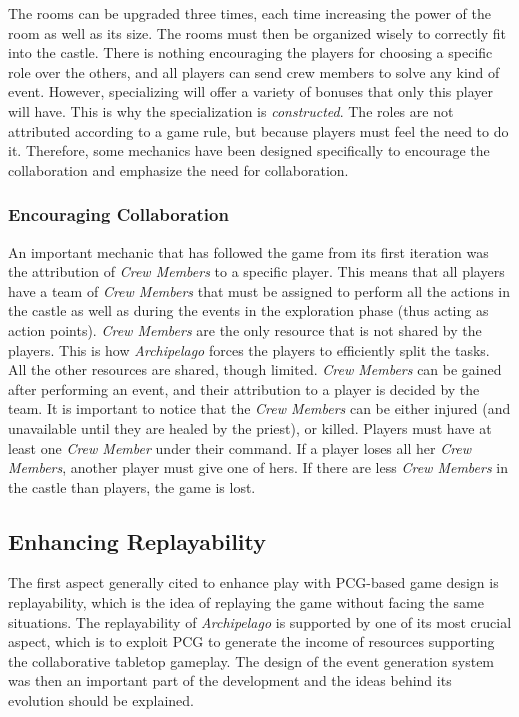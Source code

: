 The rooms can be upgraded three times, each time increasing the power of the room as well as its size. The rooms must then be organized wisely to correctly fit into the castle. 
There is nothing encouraging the players for choosing a specific role over the others, and all players can send crew members to solve any kind of event. However, specializing will offer a variety of bonuses that only this player will have. This is why the specialization is \textit{constructed}. The roles are not attributed according to a game rule, but because players must feel the need to do it. Therefore, some mechanics have been designed specifically to encourage the collaboration and emphasize the need for collaboration.
\subsubsection{Encouraging Collaboration} 
An important mechanic that has followed the game from its first iteration was the attribution of \textit{Crew Members} to a specific player. This means that all players have a team of \textit{Crew Members} that must be assigned to perform all the actions in the castle as well as during the events in the exploration phase (thus acting as action points). \textit{Crew Members} are the only resource that is not shared by the players. This is how \textit{Archipelago} forces the players to efficiently split the tasks. All the other resources are shared, though limited. \textit{Crew Members} can be gained after performing an event, and their attribution to a player is decided by the team. It is important to notice that the \textit{Crew Members} can be either injured (and unavailable until they are healed by the priest), or killed. Players must have at least one \textit{Crew Member} under their command. If a player loses all her \textit{Crew Members}, another player must give one of hers. If there are less \textit{Crew Members} in the castle than players, the game is lost.
\subsection{Enhancing Replayability} 
The first aspect generally cited to enhance play with PCG-based game design is replayability, which is the idea of replaying the game without facing the same situations. The replayability of \textit{Archipelago} is supported by one of its most crucial aspect, which is to exploit PCG to generate the income of resources supporting the collaborative tabletop gameplay. The design of the event generation system was then an important part of the development and the ideas behind its evolution should be explained.
